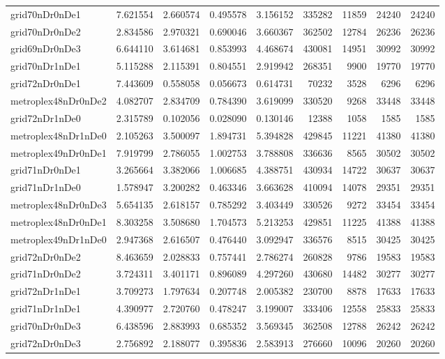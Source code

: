 \begin{longtable}{|l|r|r|r|r|r|r|r|r|}
grid70nDr0nDe1 & 7.621554 & 2.660574 & 0.495578 & 3.156152 & 335282 & 11859 & 24240 & 24240 \\
grid70nDr0nDe2 & 2.834586 & 2.970321 & 0.690046 & 3.660367 & 362502 & 12784 & 26236 & 26236 \\
grid69nDr0nDe3 & 6.644110 & 3.614681 & 0.853993 & 4.468674 & 430081 & 14951 & 30992 & 30992 \\
grid70nDr1nDe1 & 5.115288 & 2.115391 & 0.804551 & 2.919942 & 268351 & 9900 & 19770 & 19770 \\
grid72nDr0nDe1 & 7.443609 & 0.558058 & 0.056673 & 0.614731 & 70232 & 3528 & 6296 & 6296 \\
metroplex48nDr0nDe2 & 4.082707 & 2.834709 & 0.784390 & 3.619099 & 330520 & 9268 & 33448 & 33448 \\
grid72nDr1nDe0 & 2.315789 & 0.102056 & 0.028090 & 0.130146 & 12388 & 1058 & 1585 & 1585 \\
metroplex48nDr1nDe0 & 2.105263 & 3.500097 & 1.894731 & 5.394828 & 429845 & 11221 & 41380 & 41380 \\
metroplex49nDr0nDe1 & 7.919799 & 2.786055 & 1.002753 & 3.788808 & 336636 & 8565 & 30502 & 30502 \\
grid71nDr0nDe1 & 3.265664 & 3.382066 & 1.006685 & 4.388751 & 430934 & 14722 & 30637 & 30637 \\
grid71nDr1nDe0 & 1.578947 & 3.200282 & 0.463346 & 3.663628 & 410094 & 14078 & 29351 & 29351 \\
metroplex48nDr0nDe3 & 5.654135 & 2.618157 & 0.785292 & 3.403449 & 330526 & 9272 & 33454 & 33454 \\
metroplex48nDr0nDe1 & 8.303258 & 3.508680 & 1.704573 & 5.213253 & 429851 & 11225 & 41388 & 41388 \\
metroplex49nDr1nDe0 & 2.947368 & 2.616507 & 0.476440 & 3.092947 & 336576 & 8515 & 30425 & 30425 \\
grid72nDr0nDe2 & 8.463659 & 2.028833 & 0.757441 & 2.786274 & 260828 & 9786 & 19583 & 19583 \\
grid71nDr0nDe2 & 3.724311 & 3.401171 & 0.896089 & 4.297260 & 430680 & 14482 & 30277 & 30277 \\
grid72nDr1nDe1 & 3.709273 & 1.797634 & 0.207748 & 2.005382 & 230700 & 8878 & 17633 & 17633 \\
grid71nDr1nDe1 & 4.390977 & 2.720760 & 0.478247 & 3.199007 & 333406 & 12558 & 25833 & 25833 \\
grid70nDr0nDe3 & 6.438596 & 2.883993 & 0.685352 & 3.569345 & 362508 & 12788 & 26242 & 26242 \\
grid72nDr0nDe3 & 2.756892 & 2.188077 & 0.395836 & 2.583913 & 276660 & 10096 & 20260 & 20260 \\

\end{longtable}
